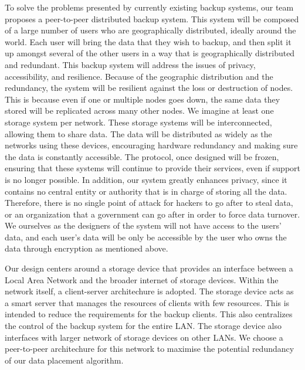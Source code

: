 To solve the problems presented by currently existing backup systems, our team proposes a peer-to-peer distributed backup system.  This system will be composed of a large number of users who are geographically distributed, ideally around the world.  Each user will bring the data that they wish to backup, and then split it up amongst several of the other users in a way that is geographically distributed and redundant.  This backup system will address the issues of privacy, accessibility, and resilience.  Because of the geographic distribution and the redundancy, the system will be resilient against the loss or destruction of nodes.  This is because even if one or multiple nodes goes down, the same data they stored will be replicated across many other nodes.
We imagine at least one storage system per network. These storage systems will be interconnected, allowing them to share data. The data will be distributed as widely as the networks using these devices, encouraging hardware redundancy and making sure the data is constantly accessible. The protocol, once designed will be frozen, ensuring that these systems will continue to provide their services, even if support is no longer possible. In addition, our system greatly enhances privacy, since it contains no central entity or authority that is in charge of storing all the data.  Therefore, there is no single point of attack for hackers to go after to steal data, or an organization that a government can go after in order to force data turnover.  We ourselves as the designers of the system will not have access to the users' data, and each user's data will be only be accessible by the user who owns the data through encryption as mentioned above.

Our design centers around a storage device that provides an interface between a Local Area Network and the broader internet of storage devices. Within the network itself, a client-server architechure is adopted. The storage device acts as a smart server that manages the resources of clients with few resources. This is intended to reduce the requirements for the backup clients. This also centralizes the control of the backup system for the entire LAN. The storage device also interfaces with larger network of storage devices on other LANs. We choose a peer-to-peer architechure for this network to maximise the potential redundancy of our data placement algorithm.

